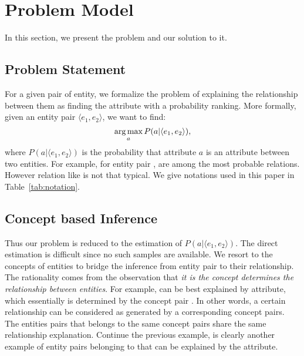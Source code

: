 
\section{Problem Model}
\label{sec:framework}

In this section, we present the problem and our solution to it.

\subsection{Problem Statement}
For a given pair of entity, we formalize the problem of explaining the relationship between them as finding the attribute with a probability ranking.
More formally, given an entity pair $ \langle e_1, e_2 \rangle $, we want to find:
\begin{equation}
\operatorname*{arg\,max}_a P(a|\langle e_1,e_2 \rangle),
\end{equation}
where $P(a| \langle e_1, e_2 \rangle )$ is the probability that attribute $a$ is an attribute between two entities.
For example, for entity pair ,  are among the most probable relations.
However relation like  is not that typical. We give notations used in this paper in Table~\ref{tab:notation}.

\subsection{Concept based Inference}
Thus our problem is reduced to the estimation of $P(a| \langle e_1, e_2 \rangle )$.
The direct estimation is difficult since no such samples are available.
We resort to the concepts of entities to bridge the inference from entity pair to their relationship.
The rationality comes from the observation that {\it it is the concept determines the relationship between entities}.
For example,  can be best explained by  attribute, which essentially is determined by the concept pair .
In other words, a certain relationship can be considered as generated by a corresponding concept pairs.
The entities pairs that belongs to the same concept pairs share the same relationship explanation.
Continue the previous example,  is clearly another example of entity pairs belonging to  that can be explained by the  attribute.

